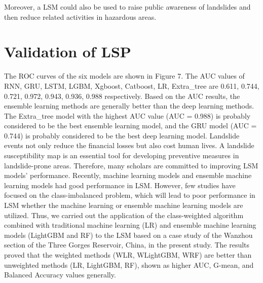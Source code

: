 \documentclass[a4paper,fleqn]{cas-sc}
\begin{document}
Moreover, a LSM could also be used to raise public awareness of landslides and then reduce related activities in hazardous areas.

\section{Validation of LSP}

The ROC curves of the six models are shown in Figure 7. 
The AUC values of RNN, GRU, LSTM, LGBM, Xgboost, Catboost, LR, Extra\_tree are 0.611, 0.744, 0.721, 0.972, 0.943, 0.936, 0.988 respectively. 
Based on the AUC results, the ensemble learning methods are generally better than the deep learning methods.
The Extra\_tree model with the highest AUC value (AUC = 0.988) is probably considered to be the best ensemble learning model, and the GRU model (AUC = 0.744) is probably considered to be the best deep learning model.
Landslide events not only reduce the financial losses but also cost human lives. 
A landslide susceptibility map is an essential tool for developing preventive measures in landslide-prone areas. Therefore, many scholars are committed to improving LSM models' performance. 
Recently, machine learning models and ensemble machine learning models had good performance in LSM. 
However, few studies have focused on the class-imbalanced problem, which will lead to poor performance in LSM whether the machine learning or ensemble machine learning models are utilized. 
Thus, we carried out the application of the class-weighted algorithm combined with traditional machine learning (LR) and ensemble machine learning models (LightGBM and RF) to the LSM based on a case study of the Wanzhou section of the Three Gorges Reservoir, China, in the present study. 
The results proved that the weighted methods (WLR, WLightGBM, WRF) are better than unweighted methods (LR, LightGBM, RF), shown as higher AUC, G-mean, and Balanced Accuracy values generally. 
\end{document}
